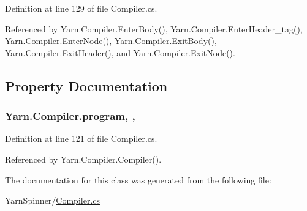 Definition at line 129 of file Compiler.\-cs.



Referenced by Yarn.\-Compiler.\-Enter\-Body(), Yarn.\-Compiler.\-Enter\-Header\-\_\-tag(), Yarn.\-Compiler.\-Enter\-Node(), Yarn.\-Compiler.\-Exit\-Body(), Yarn.\-Compiler.\-Exit\-Header(), and Yarn.\-Compiler.\-Exit\-Node().



\subsection{Property Documentation}
\hypertarget{a00051_aa1737da428ec7d597009661dd8a47829}{
\subsubsection[{program}]{ Yarn.\-Compiler.\-program\hspace{0.3cm}{\ttfamily [get]}, {\ttfamily [set]}, {\ttfamily [package]}}}\label{a00051_aa1737da428ec7d597009661dd8a47829}


Definition at line 121 of file Compiler.\-cs.



Referenced by Yarn.\-Compiler.\-Compiler().



The documentation for this class was generated from the following file\-:\begin{DoxyCompactItemize}
\item 
Yarn\-Spinner/\hyperlink{a00281}{Compiler.\-cs}\end{DoxyCompactItemize}
